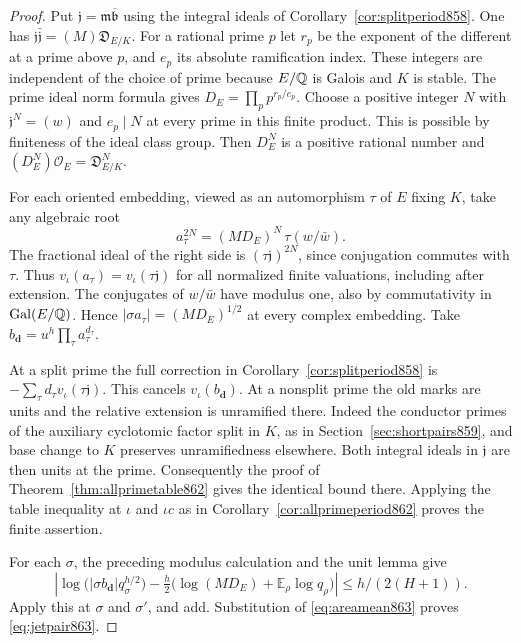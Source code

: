 \documentclass[a4paper,11pt]{article}
\theoremstyle{definition}
\theoremstyle{remark}
\numberwithin{equation}{section}
\begin{document}
\begin{proof}
Put \(\mathfrak j=\mathfrak m\overline{\mathfrak b}\) using the
integral ideals of Corollary~\ref{cor:splitperiod858}. One has
\(\mathfrak j\bar{\mathfrak j}=(M)\mathfrak D_{E/K}\).
For a rational prime \(p\) let \(r_p\) be the exponent of the
different at a prime above \(p\), and \(e_p\) its absolute
ramification index. These integers are independent of the choice
of prime because \(E/\mathbb Q\) is Galois and \(K\) is stable. The prime
ideal norm formula gives \(D_E=\prod_p p^{r_p/e_p}\). Choose a
positive integer \(N\) with \(\mathfrak j^N=(w)\) and
\(e_p\mid N\) at every prime in this finite product. This is
possible by finiteness of the ideal class group. Then \(D_E^N\)
is a positive rational number and
\((D_E^N)\mathcal O_E=\mathfrak D_{E/K}^N\).

For each oriented embedding, viewed as an automorphism \(\tau\)
of \(E\) fixing \(K\), take any algebraic root
\[
             a_\tau^{2N}=(MD_E)^N\,\tau(w/\bar w).
\]
The fractional ideal of the right side is
\((\tau\mathfrak j)^{2N}\), since conjugation commutes with \(\tau\).
Thus \(v_\iota(a_\tau)=v_\iota(\tau\mathfrak j)\) for all normalized
finite valuations, including after extension. The conjugates of
\(w/\bar w\) have modulus one, also by commutativity in
\(\operatorname{Gal}(E/\mathbb Q)\). Hence
\(|\sigma a_\tau|=(MD_E)^{1/2}\) at every complex embedding.
Take \(b_{\mathbf d}=u^h\prod_\tau a_\tau^{d_\tau}\).

At a split prime the full correction in
Corollary~\ref{cor:splitperiod858} is
\(-\sum_\tau d_\tau v_\iota(\tau\mathfrak j)\). This cancels
\(v_\iota(b_{\mathbf d})\). At a nonsplit prime the old marks
are units and the relative extension is unramified there.
Indeed the conductor primes of the auxiliary cyclotomic factor
split in \(K\), as in Section~\ref{sec:shortpairs859}, and base
change to \(K\) preserves unramifiedness elsewhere. Both integral
ideals in \(\mathfrak j\) are then units at the prime.
Consequently the proof of Theorem~\ref{thm:allprimetable862}
gives the identical bound there. Applying the table inequality
at \(\iota\) and \(\iota c\) as in
Corollary~\ref{cor:allprimeperiod862} proves the finite assertion.

For each \(\sigma\), the preceding modulus calculation and the
unit lemma give
\[
 \left|\log\big(|\sigma b_{\mathbf d}|q_\sigma^{h/2}\big)
   -\tfrac h2\big(\log(MD_E)+\mathbb E_\rho\log q_\rho\big)\right|
          \le h/(2(H+1)).
\]
Apply this at \(\sigma\) and \(\sigma'\), and add. Substitution of
\eqref{eq:areamean863} proves \eqref{eq:jetpair863}.
\end{proof}
\end{document}
